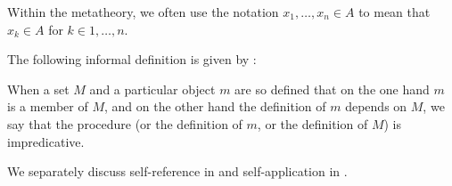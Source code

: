 \begin{remark}\label{rem:multiple_set_membership_shorthand}
  Within the metatheory, we often use the notation \( x_1, \ldots, x_n \in A \) to mean that \( x_k \in A \) for \( k \in 1, \ldots, n \).
\end{remark}

\begin{concept}\label{con:impredicativity}
  The following informal definition is given by :
  \begin{displayquote}
    When a set \( M \) and a particular object \( m \) are so defined that on the one hand \( m \) is a member of \( M \), and on the other hand the definition of \( m \) depends on \( M \), we say that the procedure (or the definition of \( m \), or the definition of \( M \)) is impredicative.
  \end{displayquote}
\end{concept}
\begin{comments}
  \item We separately discuss self-reference in  and self-application in .
\end{comments}

